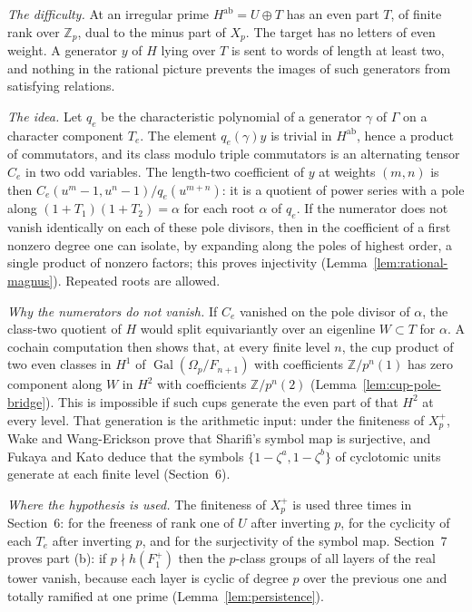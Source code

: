 \documentclass[11pt]{article}
\theoremstyle{definition}
\numberwithin{equation}{section}
\begin{document}
\emph{The difficulty.} At an irregular prime $H^{\mathrm{ab}}=U\oplus T$ has an even part $T$, of finite rank over
$\mathbb Z_p$, dual to the minus part of $X_p$. The target has no letters of even weight. A generator $y$ of $H$
lying over $T$ is sent to words of length at least two, and nothing in the rational picture prevents the images
of such generators from satisfying relations.

\emph{The idea.} Let $q_e$ be the characteristic polynomial of a generator $\gamma$ of $\Gamma$ on a character
component $T_e$. The element $q_e(\gamma)y$ is trivial in $H^{\mathrm{ab}}$, hence a product of commutators, and its
class modulo triple commutators is an alternating tensor $C_e$ in two odd variables. The length-two coefficient
of $y$ at weights $(m,n)$ is then $C_e(u^m-1,u^n-1)/q_e(u^{m+n})$: it is a quotient of power series with a pole
along $(1+T_1)(1+T_2)=\alpha$ for each root $\alpha$ of $q_e$. If the numerator does not vanish identically on
each of these pole divisors, then in the coefficient of a first nonzero degree one can isolate, by expanding along
the poles of highest order, a single product of nonzero factors; this proves injectivity
(Lemma~\ref{lem:rational-magnus}). Repeated roots are allowed.

\emph{Why the numerators do not vanish.} If $C_e$ vanished on the pole divisor of $\alpha$, the class-two quotient
of $H$ would split equivariantly over an eigenline $W\subset T$ for $\alpha$. A cochain computation then shows
that, at every finite level $n$, the cup product of two even classes in $H^1$ of
$\operatorname{Gal}(\Omega_p/F_{n+1})$ with coefficients $\mathbb Z/p^n(1)$ has zero component along $W$ in
$H^2$ with coefficients $\mathbb Z/p^n(2)$ (Lemma~\ref{lem:cup-pole-bridge}). This is impossible if such cups
generate the even part of that $H^2$ at every level. That generation is the arithmetic input: under the
finiteness of $X_p^+$, Wake and Wang-Erickson prove that Sharifi's symbol map is surjective, and Fukaya and Kato
deduce that the symbols $\{1-\zeta^a,1-\zeta^b\}$ of cyclotomic units generate at each finite level
(Section~6).

\emph{Where the hypothesis is used.} The finiteness of $X_p^+$ is used three times in Section~6: for the
freeness of rank one of $U$ after inverting $p$, for the cyclicity of each $T_e$ after inverting $p$, and for the
surjectivity of the symbol map. Section~7 proves part (b): if $p\nmid h(F_1^+)$ then the $p$-class groups of all
layers of the real tower vanish, because each layer is cyclic of degree $p$ over the previous one and totally
ramified at one prime (Lemma~\ref{lem:persistence}).
\end{document}
